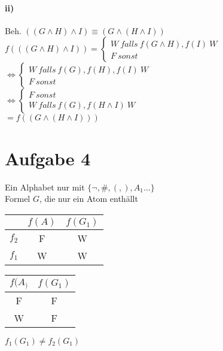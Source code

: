\documentclass[a4paper]{scrartcl}
\begin{document}
\paragraph*{ii)}
Beh. $(( G \wedge H) \wedge I) \equiv (G \wedge ( H \wedge I))$\\
$f ((( G \wedge H) \wedge I)) = \begin{cases} W\ falls\ f(G \wedge H), f(I)\ W \\ F\ sonst \end{cases}$\\
$\Leftrightarrow \begin{cases} W\ falls\ f(G), f(H), f(I)\ W \\ F\ sonst \end{cases}$\\
$\Leftrightarrow \begin{cases} F\ sonst \\ W\ falls\ f(G), f(H \wedge I)\ W \end{cases}$\\
$= f((G \wedge (H \wedge I)))$

\section*{Aufgabe 4}

Ein Alphabet nur mit $\{\neg, \#, (, ), A_1 … \}$\\
Formel $G$, die nur ein Atom enthällt\\
\begin{tabular}{cc|c}
 & $f(A)$ & $f(G_1)$\\
 \hline
$f_2$ & F & W \\
$f_1$ & W & W \\
\end{tabular}

\begin{tabular}{c|c}
$f(A_)$ & $f(G_1)$\\
\hline
F & F \\
W & F \\
\end{tabular}

$f_1(G_1) \neq f_2(G_1)$\\
\end{document}

